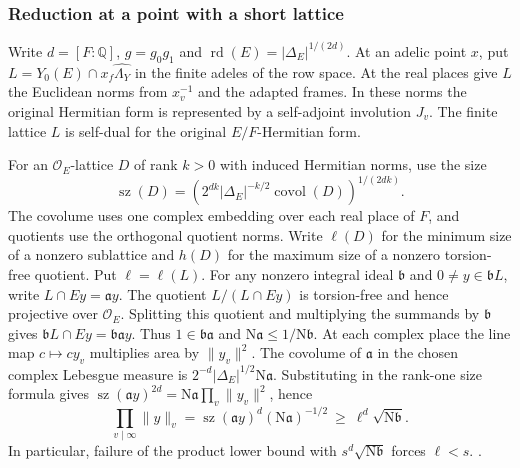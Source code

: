%
\subsubsection{Reduction at a point with a short lattice}\label{sec:principal-short-lattice}
Write \(d=[F:\mathbb Q]\), \(g=g_0g_1\) and
\(\operatorname{rd}(E)=|\Delta_E|^{1/(2d)}\). At an adelic
point \(x\), put \(L=Y_0(E)\cap x_f\widehat{\Lambda_Y}\)
in the finite adeles of the row space.
At the real places give \(L\) the Euclidean norms from
\(x_v^{-1}\) and the adapted frames. In these norms the
original Hermitian form is represented by a self-adjoint
involution \(J_v\). The finite lattice \(L\) is self-dual
for the original \(E/F\)-Hermitian form.

For an \(\mathcal O_E\)-lattice \(D\) of rank \(k>0\) with
induced Hermitian norms, use the size
\[
 \operatorname{sz}(D)
 =\left(2^{dk}|\Delta_E|^{-k/2}\operatorname{covol}(D)\right)^{1/(2dk)} .
\]
The covolume uses one complex embedding over each real place
of \(F\), and quotients use the orthogonal quotient norms.
Write \(\ell(D)\) for the minimum size of a nonzero sublattice
and \(h(D)\) for the maximum size of a nonzero torsion-free
quotient. Put \(\ell=\ell(L)\).
For any nonzero integral ideal \(\mathfrak b\) and
\(0\ne y\in\mathfrak b L\), write \(L\cap Ey=\mathfrak a y\).
The quotient \(L/(L\cap Ey)\) is torsion-free and hence projective
over \(\mathcal O_E\). Splitting this quotient and multiplying the
summands by \(\mathfrak b\) gives
\(\mathfrak b L\cap Ey=\mathfrak b\mathfrak a y\).
Thus \(1\in\mathfrak b\mathfrak a\) and
\(\mathrm N\mathfrak a\le1/\mathrm N\mathfrak b\).
At each complex place the line map \(c\mapsto c y_v\) multiplies
area by \(\|y_v\|^2\). The covolume of \(\mathfrak a\) in the chosen
complex Lebesgue measure is
\(2^{-d}|\Delta_E|^{1/2}\mathrm N\mathfrak a\).
Substituting in the rank-one size formula gives
\(\operatorname{sz}(\mathfrak a y)^{2d}
=\mathrm N\mathfrak a\prod_v\|y_v\|^2\), hence
\[
 \prod_{v\mid\infty}\|y\|_v
 =\operatorname{sz}(\mathfrak a y)^d(\mathrm N\mathfrak a)^{-1/2}
 \ \ge\ \ell^d\sqrt{\mathrm N\mathfrak b}.
\]
In particular, failure of the product lower bound with
\(s^d\sqrt{\mathrm N\mathfrak b}\) forces \(\ell<s\).
.

